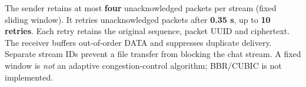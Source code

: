 The sender retains at most \textbf{four} unacknowledged packets per stream (fixed sliding window). It retries unacknowledged packets after \textbf{0.35 s}, up to \textbf{10 retries}. Each retry retains the original sequence, packet UUID and ciphertext. The receiver buffers out-of-order DATA and suppresses duplicate delivery. Separate stream IDs prevent a file transfer from blocking the chat stream. A fixed window is \emph{not} an adaptive congestion-control algorithm; BBR/CUBIC is not implemented.
